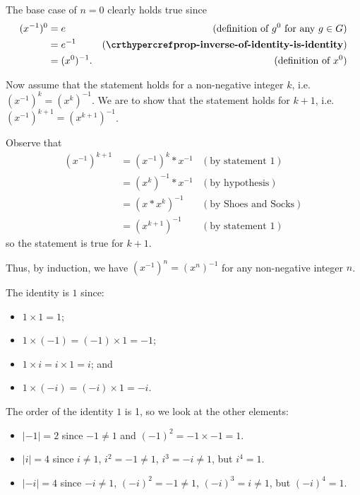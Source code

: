 \begin{questions}
    The base case of $n = 0$ clearly holds true since
    \begin{align*}
        (x^{-1})^0 &= e & (\text{definition of }g^0 \text{ for any }g\in G)\\
        &= e^{-1} & (\myref{prop-inverse-of-identity-is-identity})\\
        &= (x^0)^{-1}. & (\text{definition of }x^0)
    \end{align*}

    Now assume that the statement holds for a non-negative integer $k$, i.e. $(x^{-1})^k = (x^k)^{-1}$. We are to show that the statement holds for $k+1$, i.e. $(x^{-1})^{k+1} = (x^{k+1})^{-1}$.

    Observe that
    \begin{align*}
        (x^{-1})^{k+1} &= (x^{-1})^k \ast x^{-1} & (\text{by statement 1})\\
        &= (x^k)^{-1} \ast x^{-1} & (\text{by hypothesis})\\
        &= (x\ast x^k)^{-1} & (\text{by Shoes and Socks})\\
        &= (x^{k+1})^{-1} & (\text{by statement 1})
    \end{align*}
    so the statement is true for $k+1$.

    Thus, by induction, we have $(x^{-1})^n = (x^n)^{-1}$ for any non-negative integer $n$.

    \item \begin{partquestions}{\roman*}
        \item The identity is $1$ since:
        \begin{itemize}
            \item $1 \times 1 = 1$;
            \item $1 \times (-1) = (-1) \times 1 = -1$;
            \item $1 \times i = i \times 1 = i$; and
            \item $1 \times (-i) = (-i) \times 1 = -i$.
        \end{itemize}
        \item The order of the identity $1$ is 1, so we look at the other elements:
        \begin{itemize}
            \item $|-1| = 2$ since $-1 \neq 1$ and $(-1)^2 = -1 \times -1 = 1$.
            \item $|i| = 4$ since $i \neq 1$, $i^2 = -1 \neq 1$, $i^3 = -i \neq 1$, but $i^4 = 1$.
            \item $|-i| = 4$ since $-i \neq 1$, $(-i)^2 = -1 \neq 1$, $(-i)^3 = i \neq 1$, but $(-i)^4 = 1$.
        \end{itemize}
    \end{partquestions}


\end{questions}
